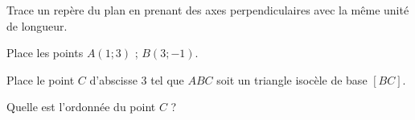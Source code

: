 \begin{myenumerate}
\item Trace un repère du plan en prenant des axes perpendiculaires avec la même unité de longueur.
\item Place les points $A(1;3)$ ; $B(3;-1)$.
\item Place le point $C$ d'abscisse 3 tel que $ABC$ soit un triangle isocèle de base $[BC]$.
\item Quelle est l'ordonnée du point $C$ ?
\end{myenumerate}